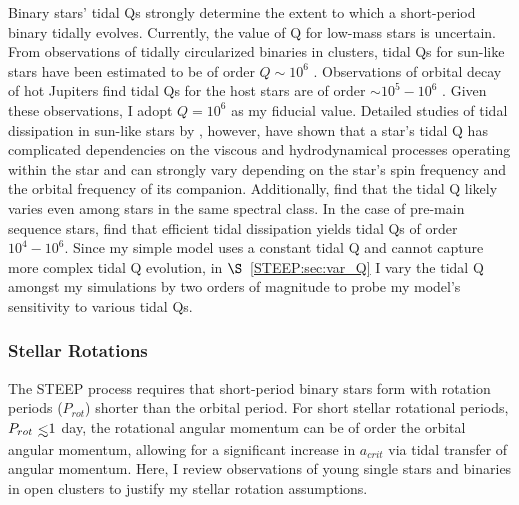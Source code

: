 Binary stars' tidal Qs strongly determine the extent to which a short-period binary tidally evolves.  Currently, the value of Q for low-mass stars is uncertain.  From observations of tidally circularized binaries in clusters, tidal Qs for sun-like stars have been estimated to be of order $Q{\sim}10^6$ \citep[e.g.][]{Meibom2005}.  Observations of orbital decay of hot Jupiters find tidal Qs for the host stars are of order ${\sim}10^5-10^6$ \citep{Jackson2009,Essick2016,Patra2017,Wilkins2017}.  Given these observations, I adopt $Q=10^6$ as my fiducial value.  Detailed studies of tidal dissipation in sun-like stars by \citet{Ogilvie2007}, however, have shown that a star's tidal Q has complicated dependencies on the viscous and hydrodynamical processes operating within the star and can strongly vary depending on the star's spin frequency and the orbital frequency of its companion.  Additionally, \citet{Barker2009} find that the tidal Q likely varies even among stars in the same spectral class.  In the case of pre-main sequence stars, \citet{Bolmont2016} find that efficient tidal dissipation yields tidal Qs of order $10^4-10^6$.  Since my simple model uses a constant tidal Q and cannot capture more complex tidal Q evolution, in $\S$~\ref{STEEP:sec:var_Q} I vary the tidal Q amongst my simulations by two orders of magnitude to probe my model's sensitivity to various tidal Qs.

\subsubsection{Stellar Rotations} \label{STEEP:sec:stellar_rotations}

The STEEP process requires that short-period binary stars form with rotation periods ($P_{rot}$) shorter than the orbital period.  For short stellar rotational periods, $P_{rot} \lsim 1$ day, the rotational angular momentum can be of order the orbital angular momentum, allowing for a significant increase in $a_{crit}$ via tidal transfer of angular momentum.  Here, I review observations of young single stars and binaries in open clusters to justify my stellar rotation assumptions.

